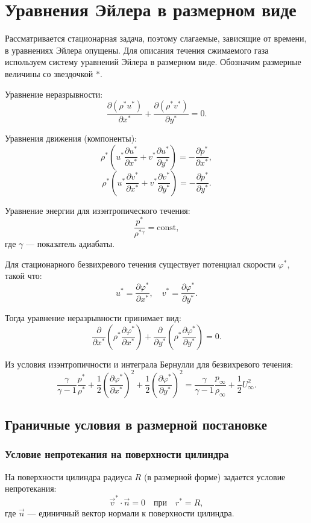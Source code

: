 \section{Уравнения Эйлера в размерном виде}
	
	Рассматривается стационарная задача, поэтому слагаемые, зависящие от времени, в уравнениях Эйлера опущены. Для описания течения сжимаемого газа используем систему уравнений Эйлера в размерном виде. Обозначим размерные величины со звездочкой $*$. 
	
	Уравнение неразрывности:
	\[
	\frac{\partial (\rho^* u^*)}{\partial x^*} + \frac{\partial (\rho^* v^*)}{\partial y^*} = 0.
	\]
	
	Уравнения движения (компоненты):
	\[
	\rho^* \left( u^* \frac{\partial u^*}{\partial x^*} + v^* \frac{\partial u^*}{\partial y^*} \right) = -\frac{\partial p^*}{\partial x^*},
	\]
	\[
	\rho^* \left( u^* \frac{\partial v^*}{\partial x^*} + v^* \frac{\partial v^*}{\partial y^*} \right) = -\frac{\partial p^*}{\partial y^*}.
	\]
	
	Уравнение энергии для изэнтропического течения:
	\[
	\frac{p^*}{\rho^{*\gamma}} = \text{const},
	\]
	где $\gamma$ — показатель адиабаты.
	
	Для стационарного безвихревого течения существует потенциал скорости $\varphi^*$, такой что:
	\[
	u^* = \frac{\partial \varphi^*}{\partial x^*}, \quad v^* = \frac{\partial \varphi^*}{\partial y^*}.
	\]
	
	Тогда уравнение неразрывности принимает вид:
	\[
	\frac{\partial}{\partial x^*} \left( \rho^* \frac{\partial \varphi^*}{\partial x^*} \right) + \frac{\partial}{\partial y^*} \left( \rho^* \frac{\partial \varphi^*}{\partial y^*} \right) = 0.
	\]
	
	Из условия изэнтропичности и интеграла Бернулли для безвихревого течения:
	\[
	\frac{\gamma}{\gamma-1} \frac{p^*}{\rho^*} + \frac{1}{2} \left( \frac{\partial \varphi^*}{\partial x^*} \right)^2 + \frac{1}{2} \left( \frac{\partial \varphi^*}{\partial y^*} \right)^2 = 
	\frac{\gamma}{\gamma-1} \frac{p_\infty}{\rho_\infty} + \frac{1}{2} U_\infty^2.
	\]
	
	\subsection{Граничные условия в размерной постановке}
	
	\subsubsection{Условие непротекания на поверхности цилиндра}
	На поверхности цилиндра радиуса $R$ (в размерной форме) задается условие непротекания:
	\[
	\vec{v}^* \cdot \vec{n} = 0 \quad \text{при} \quad r^* = R,
	\]
	где $\vec{n}$ — единичный вектор нормали к поверхности цилиндра.
	
